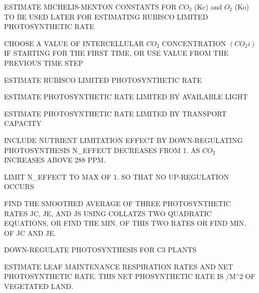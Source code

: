 E\+S\+T\+I\+M\+A\+T\+E M\+I\+C\+H\+E\+L\+I\+S-\/\+M\+E\+N\+T\+O\+N C\+O\+N\+S\+T\+A\+N\+T\+S F\+O\+R $CO_2$ (Kc) and $O_2$ (Ko) T\+O B\+E U\+S\+E\+D L\+A\+T\+E\+R F\+O\+R E\+S\+T\+I\+M\+A\+T\+I\+N\+G R\+U\+B\+I\+S\+C\+O L\+I\+M\+I\+T\+E\+D P\+H\+O\+T\+O\+S\+Y\+N\+T\+H\+E\+T\+I\+C R\+A\+T\+E

C\+H\+O\+O\+S\+E A V\+A\+L\+U\+E O\+F I\+N\+T\+E\+R\+C\+E\+L\+L\+U\+L\+A\+R $CO_2$ C\+O\+N\+C\+E\+N\+T\+R\+A\+T\+I\+O\+N $(CO_2i)$ I\+F S\+T\+A\+R\+T\+I\+N\+G F\+O\+R T\+H\+E F\+I\+R\+S\+T T\+I\+M\+E, O\+R U\+S\+E V\+A\+L\+U\+E F\+R\+O\+M T\+H\+E P\+R\+E\+V\+I\+O\+U\+S T\+I\+M\+E S\+T\+E\+P

E\+S\+T\+I\+M\+A\+T\+E R\+U\+B\+I\+S\+C\+O L\+I\+M\+I\+T\+E\+D P\+H\+O\+T\+O\+S\+Y\+N\+T\+H\+E\+T\+I\+C R\+A\+T\+E

E\+S\+T\+I\+M\+A\+T\+E P\+H\+O\+T\+O\+S\+Y\+N\+T\+H\+E\+T\+I\+C R\+A\+T\+E L\+I\+M\+I\+T\+E\+D B\+Y A\+V\+A\+I\+L\+A\+B\+L\+E L\+I\+G\+H\+T

E\+S\+T\+I\+M\+A\+T\+E P\+H\+O\+T\+O\+S\+Y\+N\+T\+H\+E\+T\+I\+C R\+A\+T\+E L\+I\+M\+I\+T\+E\+D B\+Y T\+R\+A\+N\+S\+P\+O\+R\+T C\+A\+P\+A\+C\+I\+T\+Y

I\+N\+C\+L\+U\+D\+E N\+U\+T\+R\+I\+E\+N\+T L\+I\+M\+I\+T\+A\+T\+I\+O\+N E\+F\+F\+E\+C\+T B\+Y D\+O\+W\+N-\/\+R\+E\+G\+U\+L\+A\+T\+I\+N\+G P\+H\+O\+T\+O\+S\+Y\+N\+T\+H\+E\+S\+I\+S N\+\_\+\+E\+F\+F\+E\+C\+T D\+E\+C\+R\+E\+A\+S\+E\+S F\+R\+O\+M 1. A\+S $CO_2$ I\+N\+C\+R\+E\+A\+S\+E\+S A\+B\+O\+V\+E 288 P\+P\+M.

L\+I\+M\+I\+T N\+\_\+\+E\+F\+F\+E\+C\+T T\+O M\+A\+X O\+F 1. S\+O T\+H\+A\+T N\+O U\+P-\/\+R\+E\+G\+U\+L\+A\+T\+I\+O\+N O\+C\+C\+U\+R\+S

F\+I\+N\+D T\+H\+E S\+M\+O\+O\+T\+H\+E\+D A\+V\+E\+R\+A\+G\+E O\+F T\+H\+R\+E\+E P\+H\+O\+T\+O\+S\+Y\+N\+T\+H\+E\+T\+I\+C R\+A\+T\+E\+S J\+C, J\+E, A\+N\+D J\+S U\+S\+I\+N\+G C\+O\+L\+L\+A\+T\+Z\textquotesingle{}S T\+W\+O Q\+U\+A\+D\+R\+A\+T\+I\+C E\+Q\+U\+A\+T\+I\+O\+N\+S, O\+R F\+I\+N\+D T\+H\+E M\+I\+N. O\+F T\+H\+I\+S T\+W\+O R\+A\+T\+E\+S O\+R F\+I\+N\+D M\+I\+N. O\+F J\+C A\+N\+D J\+E.

D\+O\+W\+N-\/\+R\+E\+G\+U\+L\+A\+T\+E P\+H\+O\+T\+O\+S\+Y\+N\+T\+H\+E\+S\+I\+S F\+O\+R C3 P\+L\+A\+N\+T\+S

E\+S\+T\+I\+M\+A\+T\+E L\+E\+A\+F M\+A\+I\+N\+T\+E\+N\+A\+N\+C\+E R\+E\+S\+P\+I\+R\+A\+T\+I\+O\+N R\+A\+T\+E\+S A\+N\+D N\+E\+T P\+H\+O\+T\+O\+S\+Y\+N\+T\+H\+E\+T\+I\+C R\+A\+T\+E. T\+H\+I\+S N\+E\+T P\+H\+O\+S\+Y\+N\+T\+H\+E\+T\+I\+C R\+A\+T\+E I\+S /\+M$^\wedge$2 O\+F V\+E\+G\+E\+T\+A\+T\+E\+D L\+A\+N\+D.

